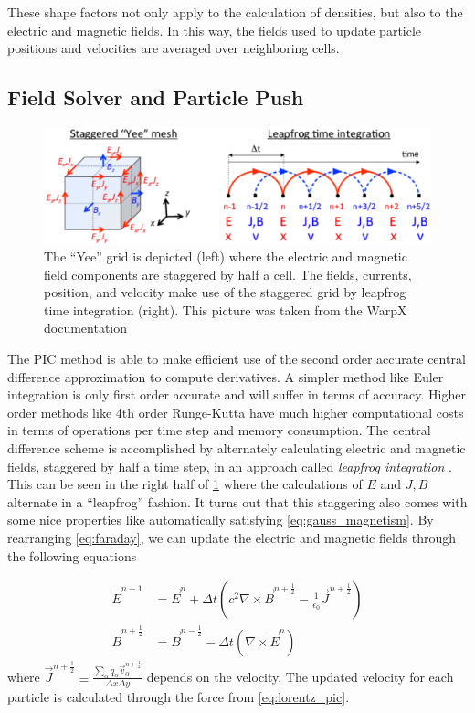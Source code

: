 These shape factors not only apply to the calculation of densities, but also to the electric and magnetic fields. In this way, the fields used to update particle positions and velocities are averaged over neighboring cells.

\subsection{Field Solver and Particle Push}

\begin{figure}
	\centering 
	\includegraphics[width=0.8\linewidth]{planning/images/yee_grid.PNG}
	\caption{The ``Yee'' grid is depicted (left) where the electric and magnetic field components are staggered by half a cell. The fields, currents, position, and velocity make use of the staggered grid by leapfrog time integration (right). This picture was taken from the WarpX documentation}
	\label{fig:yee_grid}
\end{figure}

The \gls{PIC} method is able to make efficient use of the second order accurate central difference approximation to compute derivatives. A simpler method like Euler integration is only first order accurate and will suffer in terms of accuracy. Higher order methods like 4th order Runge-Kutta have much higher computational costs in terms of operations per time step and memory consumption. The central difference scheme is accomplished by alternately calculating electric and magnetic fields, staggered by half a time step, in an approach called \emph{leapfrog integration} \cite{Birdsall_2004_PIC}. This can be seen in the right half of \cref{fig:yee_grid} where the calculations of $E$ and $J,B$ alternate in a ``leapfrog'' fashion. It turns out that this staggering also comes with some nice properties like automatically satisfying \cref{eq:gauss_magnetism}. By rearranging \cref{eq:faraday}, we can update the electric and magnetic fields through the following equations \cite{Arber_2015_PPCF}

\begin{align}
	\vec{E}^{n+1} &= \vec{E}^{n} + \Delta t (c^2 \nabla \times \vec{B}^{n+\frac{1}{2}} - \frac{1}{\epsilon_0} \vec{J}^{n+\frac{1}{2}}) \label{eq:E_update} \\
	\vec{B}^{n+\frac{1}{2}} &= \vec{B}^{n-\frac{1}{2}} - \Delta t (\nabla \times \vec{E}^{n}) \label{eq:B_update}
\end{align}
where $\vec{J}^{n+\frac{1}{2}} \equiv \frac{\sum_\alpha q_\alpha \vec{v}^{n+\frac{1}{2}}_\alpha}{\Delta x \Delta y}$ depends on the velocity. The updated velocity for each particle is calculated through the force from \cref{eq:lorentz_pic}. 

